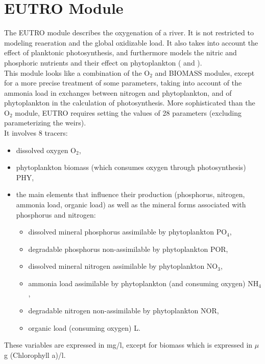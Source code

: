\chapter{EUTRO Module}

The EUTRO module describes the oxygenation of a river.
It is not restricted to modeling reaeration and the global oxidizable load.
It also takes into account the effect of planktonic photosynthesis,
and furthermore models the nitric and phosphoric nutrients and their effect
on phytoplankton (\cite{gosse_doubs_1989} and \cite{gosse_doubs_1983}).\\

This module looks like a combination of the O$_2$ and BIOMASS modules,
except for a more precise treatment of some parameters,
taking into account of the ammonia load in exchanges between nitrogen and phytoplankton,
and of phytoplankton in the calculation of photosynthesis.
More sophisticated than the O$_2$ module, EUTRO requires setting the values of
28 parameters (excluding parameterizing the weirs).\\

It involves 8 tracers:

\begin{itemize}
\item dissolved oxygen O$_2$,
\item phytoplankton biomass (which consumes oxygen through photosynthesis) PHY,
\item the main elements that influence their production
  (phosphorus, nitrogen, ammonia load, organic load)
  as well as the mineral forms associated with phosphorus and nitrogen:
\begin{itemize}
\item dissolved mineral phosphorus assimilable by phytoplankton PO$_4$,
\item degradable phosphorus non-assimilable by phytoplankton POR,
\item dissolved mineral nitrogen assimilable by phytoplankton NO$_3$,
\item ammonia load assimilable by phytoplankton (and consuming oxygen) NH$_4$,
\item degradable nitrogen non-assimilable by phytoplankton NOR,
\item organic load (consuming oxygen) L.
\end{itemize}
\end{itemize}


These variables are expressed in mg/l, except for biomass which is expressed in $\mu$g (Chlorophyll a)/l.\\

